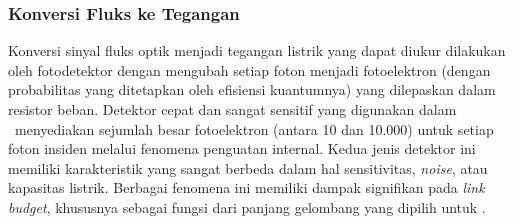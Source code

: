 
\subsubsection{Konversi Fluks ke Tegangan}
\label{subsec: Detection}
Konversi sinyal fluks optik menjadi tegangan listrik yang dapat diukur dilakukan oleh fotodetektor dengan mengubah setiap foton menjadi fotoelektron (dengan probabilitas yang ditetapkan oleh efisiensi kuantumnya) yang dilepaskan dalam resistor beban. Detektor cepat dan sangat sensitif yang digunakan dalam \lidar\ menyediakan sejumlah besar fotoelektron (antara 10 dan 10.000) untuk setiap foton insiden melalui fenomena penguatan internal. Kedua jenis detektor ini memiliki karakteristik yang sangat berbeda dalam hal sensitivitas, \textit{noise}, atau kapasitas listrik. Berbagai fenomena ini memiliki dampak signifikan pada \textit{link budget}, khususnya sebagai fungsi dari panjang gelombang yang dipilih untuk \lidar. 

